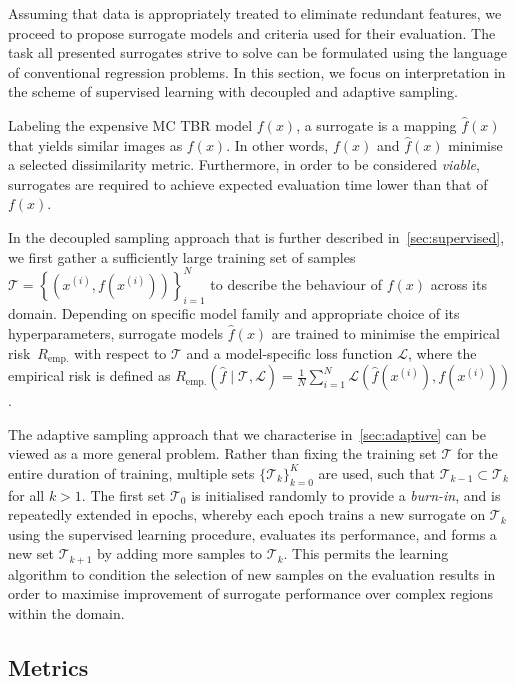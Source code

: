 Assuming that data is appropriately treated to eliminate redundant
features, we proceed to propose surrogate models and criteria
used for their evaluation. The task all presented surrogates strive to solve can be
formulated using the language of conventional regression problems. In this section,
we focus on interpretation in the scheme of supervised learning with decoupled
and adaptive sampling.

Labeling the expensive MC TBR model $f(x)$, a surrogate is a mapping
$\hat{f}(x)$ that yields similar images as $f(x)$. In other words, $f(x)$ and
$\hat{f}(x)$ minimise a selected dissimilarity metric. Furthermore, in order to
be considered \textit{viable}, surrogates are required to achieve expected evaluation time
lower than that of $f(x)$.

In the decoupled sampling approach that is further described
in~\cref{sec:supervised}, we first gather a sufficiently large
training set of samples $\mathcal{T}=\left\{\left( x^{(i)},f\left(x^{(i)}\right) \right)\right\}_{i=1}^N$
to describe the behaviour of $f(x)$ across its domain.
Depending on specific model family and appropriate choice of its
hyperparameters, surrogate models $\hat{f}(x)$ are trained to minimise
the empirical risk~$R_{\text{emp.}}$ with respect to $\mathcal{T}$ and a model-specific
loss function $\mathcal{L}$, where the empirical risk is defined as
$R_{\text{emp.}}(\hat{f}\mid\mathcal{T},\mathcal{L})
	=\frac{1}{N}\sum_{i=1}^N
	\mathcal{L}\left(\hat{f}(x^{(i)}),f(x^{(i)})\right)$.


The adaptive sampling approach that we characterise in~\cref{sec:adaptive} can be viewed as a more general problem.
Rather than fixing the training set $\mathcal{T}$ for the entire duration of
training, multiple sets $\{\mathcal{T}_k\}_{k=0}^K$ are used, such that
$\mathcal{T}_{k-1}\subset\mathcal{T}_k$ for all $k>1$. The first set
$\mathcal{T}_0$ is initialised randomly to provide a \textit{burn-in}, and is
repeatedly extended in epochs, whereby each epoch trains a new surrogate on
$\mathcal{T}_k$ using the supervised learning procedure, evaluates its
performance, and forms a new set $\mathcal{T}_{k+1}$ by adding more samples to
$\mathcal{T}_k$. This permits the learning algorithm to condition the selection
of new samples on the evaluation results in order to maximise improvement of
surrogate performance over complex regions within the domain.


\subsection{Metrics}
\label{sec:metrics}

